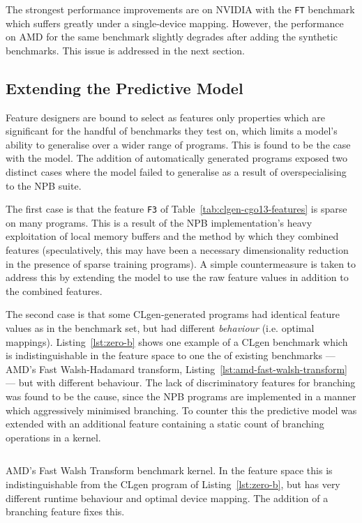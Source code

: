 The strongest performance improvements are on NVIDIA with the \texttt{FT} benchmark which suffers greatly under a single-device mapping. However, the performance on AMD for the same benchmark slightly degrades after adding the synthetic benchmarks. This issue is addressed in the next section.


\subsection{Extending the Predictive Model}
\label{subsec:eval-extended}

Feature designers are bound to select as features only properties which are significant for the handful of benchmarks they test on, which limits a model's ability to generalise over a wider range of programs. This is found to be the case with the \citeauthor{Grewe2013} model. The addition of automatically generated programs exposed two distinct cases where the model failed to generalise as a result of overspecialising to the NPB suite.

The first case is that the feature \texttt{F3} of Table~\ref{tab:clgen-cgo13-features} is sparse on many programs. This is a result of the NPB implementation's heavy exploitation of local memory buffers and the method by which they combined features (speculatively, this may have been a necessary dimensionality reduction in the presence of sparse training programs). A simple countermeasure is taken to address this by extending the model to use the raw feature values in addition to the combined features.

The second case is that some CLgen-generated programs had identical feature values as in the benchmark set, but had different \emph{behaviour} (i.e. optimal mappings). Listing~\ref{lst:zero-b} shows one example of a CLgen benchmark which is indistinguishable in the feature space to one the of existing benchmarks --- AMD's Fast Walsh-Hadamard transform, Listing~\ref{lst:amd-fast-walsh-transform} --- but with different behaviour. The lack of discriminatory features for branching was found to be the cause, since the NPB programs are implemented in a manner which aggressively minimised branching. To counter this the predictive model was extended with an additional feature containing a static count of branching operations in a kernel.

\begin{listing}
  \inputminted{opencl_lexer.py:OpenCLLexer -x}{lst/amd-fast-walsh-transform.cl}
  \caption[AMD's Fast Walsh Transform kernel]{AMD's Fast Walsh Transform benchmark kernel. In the \citeauthor{Grewe2013} feature space this is indistinguishable from the CLgen program of Listing~\ref{lst:zero-b}, but has very different runtime behaviour and optimal device mapping. The addition of a branching feature fixes this.}
  \label{lst:amd-fast-walsh-transform}
\end{listing}

